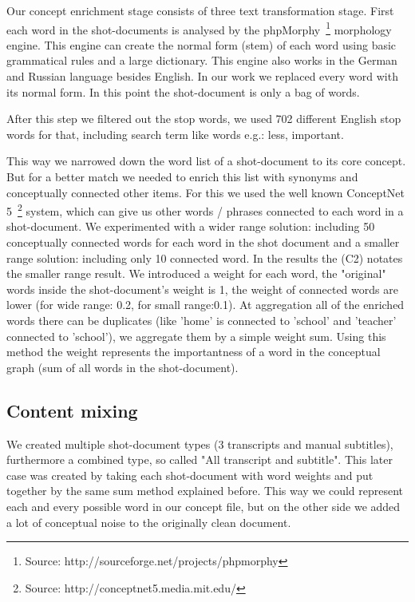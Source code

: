 \documentclass{acm_proc_article-me}
\begin{document}
Our concept enrichment stage consists of three text transformation stage. First each word in the shot-documents is analysed by the phpMorphy~\footnote{Source: http://sourceforge.net/projects/phpmorphy} morphology engine. This engine can create the normal form (stem) of each word using basic grammatical rules and a large dictionary. This engine also works in the German and Russian language besides English. In our work we replaced every word with its normal form. In this point the shot-document is only a bag of words.

After this step we filtered out the stop words, we used 702 different English stop words for that, including search term like words e.g.: less, important.

This way we narrowed down the word list of a shot-document to its core concept. But for a better match we needed to enrich this list with synonyms and conceptually connected other items. For this we used the well known ConceptNet 5~\footnote{Source: http://conceptnet5.media.mit.edu/} system, which can give us other words / phrases connected to each word in a shot-document. We experimented with a wider range solution: including 50 conceptually connected words for each word in the shot document and a smaller range solution: including only 10 connected word. In the results the (C2) notates the smaller range result. We introduced a weight for each word, the "original" words inside the shot-document's weight is 1, the weight of connected words are lower (for wide range: 0.2, for small range:0.1). At aggregation all of the enriched words there can be duplicates (like 'home' is connected to 'school' and 'teacher' connected to 'school'), we aggregate them by a simple weight sum. Using this method the weight represents the importantness of a word in the conceptual graph (sum of all words in the shot-document).

\subsection{Content mixing}

We created multiple shot-document types (3 transcripts and manual subtitles), furthermore a combined type, so called "All transcript and subtitle". This later case was created by taking each shot-document with word weights and put together by the same sum method explained before. This way we could represent each and every possible word in our concept file, but on the other side we added a lot of conceptual noise to the originally clean document.
\end{document}
